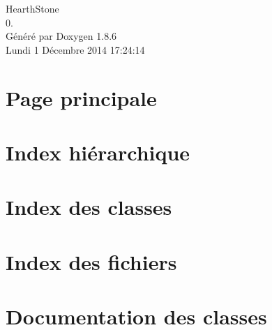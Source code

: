 \documentclass[twoside]{book}
\newcommand{\clearemptydoublepage}{%
  \newpage{\pagestyle{empty}\cleardoublepage}%
}
\begin{document}
\hypersetup{pageanchor=false}
\begin{titlepage}
\vspace*{7cm}
\begin{center}%
{\Large Hearth\-Stone \\[1ex]\large 0. }\\
\vspace*{1cm}
{\large Généré par Doxygen 1.8.6}\\
\vspace*{0.5cm}
{\small Lundi 1 Décembre 2014 17:24:14}\\
\end{center}
\end{titlepage}
\clearemptydoublepage
\tableofcontents
\clearemptydoublepage
{}
\hypersetup{pageanchor=true}

\chapter{Page principale}
\label{index}\hypertarget{index}{}
\chapter{Index hiérarchique}

\chapter{Index des classes}

\chapter{Index des fichiers}

\chapter{Documentation des classes}



























\end{document}
